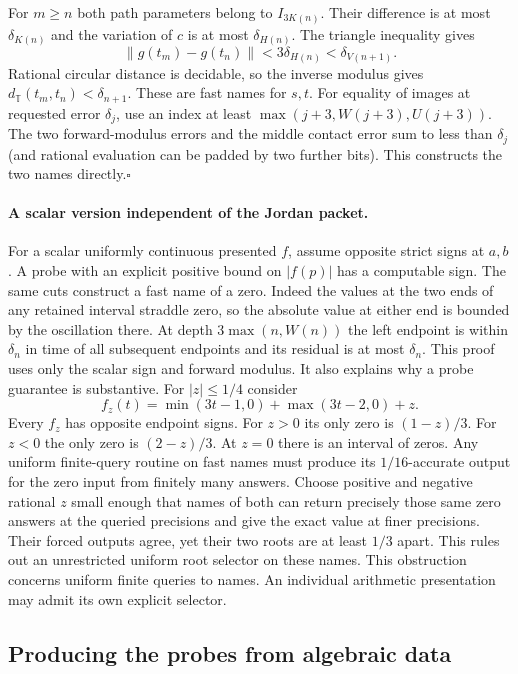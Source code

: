 For $m\ge n$ both path parameters belong to $I_{3K(n)}$. Their difference
is at most $\delta_{K(n)}$ and the variation of $c$ is at most
$\delta_{H(n)}$. The triangle inequality gives
\[
 \|g(t_m)-g(t_n)\|<3\delta_{H(n)}<\delta_{V(n+1)}.
\]
Rational circular distance is decidable, so the inverse modulus gives
$d_{\mathbb T}(t_m,t_n)<\delta_{n+1}$. These are fast names for $s,t$.
For equality of images at requested error $\delta_j$, use an index at least
$\max(j+3,W(j+3),U(j+3))$. The two forward-modulus errors and the
middle contact error sum to less than $\delta_j$ (and rational evaluation can
be padded by two further bits). This constructs the two names directly.\hfill$\square$

\paragraph{A scalar version independent of the Jordan packet.}
For a scalar uniformly continuous presented $f$, assume opposite strict
signs at $a,b$. A probe with an explicit positive bound on $|f(p)|$
has a computable sign. The same cuts construct a fast name of a zero.
Indeed the values at the two ends of any retained interval straddle zero,
so the absolute value at either end is bounded by the oscillation there.
At depth $3\max(n,W(n))$ the left endpoint is within $\delta_n$ in time
of all subsequent endpoints and its residual is at most $\delta_n$.
This proof uses only the scalar sign and forward modulus. It also explains
why a probe guarantee is substantive. For $|z|\le1/4$ consider
\[
 f_z(t)=\min(3t-1,0)+\max(3t-2,0)+z .
\]
Every $f_z$ has opposite endpoint signs. For $z>0$ its only zero is
$(1-z)/3$. For $z<0$ the only zero is $(2-z)/3$. At $z=0$ there is an
interval of zeros. Any uniform finite-query routine on fast names must
produce its $1/16$-accurate output for the zero input from finitely many
answers. Choose positive and negative rational $z$ small enough that names
of both can return precisely those same zero answers at the queried
precisions and give the exact value at finer precisions. Their forced
outputs agree, yet their two roots are at least $1/3$ apart. This rules out
an unrestricted uniform root selector on these names. This obstruction concerns uniform finite queries to names. An individual
arithmetic presentation may admit its own explicit selector.

\subsection{Producing the probes from algebraic data}

